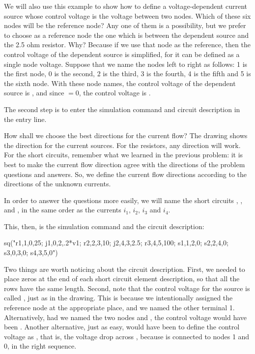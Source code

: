 We will also use this example to show how to define a
voltage-dependent current source whose control voltage is the
voltage between two nodes. Which of these six nodes will be the
reference node? Any one of them is a possibility, but we prefer to
choose as a reference node the one which is between the dependent
source and the 2.5 ohm resistor. Why? Because if we use that node as
the reference, then the control voltage of the dependent source is
simplified, for it can be defined as a single node voltage. Suppose
that we name the nodes left to right as follows: 1 is the first
node, 0 is the second, 2 is the third, 3 is the fourth, 4 is the
fifth and 5 is the sixth node. With these node names, the control
voltage of the dependent source is , and since
 $= 0$, the control voltage is .

The second step is to enter the simulation command and circuit
description in the entry line.

How shall we choose the best directions for the current flow? The
drawing shows the direction for the current sources. For the
resistors, any direction will work. For the short circuits, remember
what we learned in the previous problem: it is best to make the
current flow direction agree with the directions of the problem
questions and answers. So, we define the current flow directions
according to the directions of the unknown currents.

In order to answer the questions more easily, we will name the short
circuits , ,  and , in the same
order as the currents $i_1$, $i_2$, $i_3$ and $i_4$.

This, then, is the simulation command and the circuit description:

\begin{entry}
sq\dc("r1,1,0,25; j1,0,2,.2*v1; r2,2,3,10; j2,4,3,2.5;
      r3,4,5,100; s1,1,2,0; s2,2,4,0; s3,0,3,0; s4,3,5,0")
\end{entry}

Two things are worth noticing about the circuit description. First,
we needed to place zeros at the end of each short circuit element
description, so that all the rows have the same length. Second, note
that the control voltage for the source is called , just as
in the drawing. This is because we intentionally assigned the
reference node at the appropriate place, and we named the other
terminal 1. Alternatively, had we named the two nodes  and
, the control voltage would have been .
Another alternative, just as easy, would have been to define the
control voltage as , that is, the voltage drop across
, because  is connected to nodes 1 and 0, in the
right sequence.

